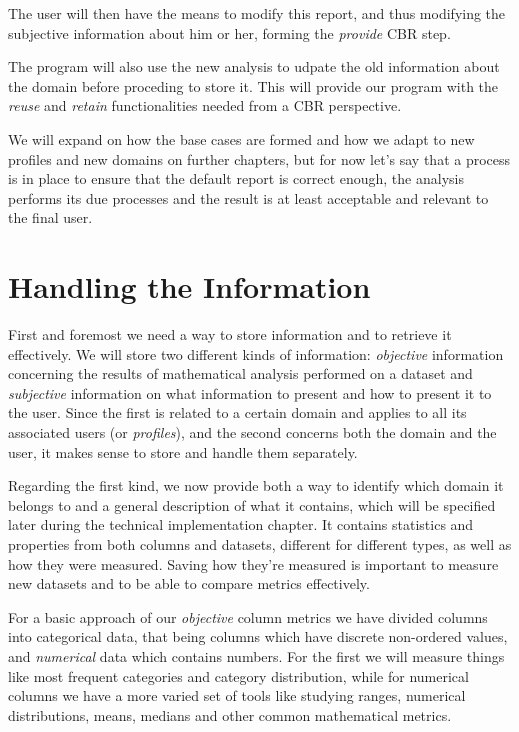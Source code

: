The user will then have the means to modify this report, and thus modifying the subjective information about him or her, forming the \textit{provide} CBR step.

The program will also use the new analysis to udpate the old information about the domain before proceding to store it.
This will provide our program with the \textit{reuse} and \textit{retain} functionalities needed from a CBR perspective.

We will expand on how the base cases are formed and how we adapt to new profiles and new domains on further chapters, but for now let's say that a process is in place to ensure that the default report is correct enough, the analysis performs its due processes and the result is at least acceptable and relevant to the final user.

\section{Handling the Information}
\label{cap2:sec:information}

First and foremost we need a way to store information and to retrieve it effectively. We will store two different kinds of information: \textit{objective} information concerning the results of mathematical analysis performed on a dataset and \textit{subjective} information on what information to present and how to present it to the user.
Since the first is related to a certain domain and applies to all its associated users (or \textit{profiles}), and the second concerns both the domain and the user, it makes sense to store and handle them separately.

Regarding the first kind, we now provide both a way to identify which domain it belongs to and a general description of what it contains, which will be specified later during the technical implementation chapter.
It contains statistics and properties from both columns and datasets, different for different types, as well as how they were measured. Saving how they're measured is important to measure new datasets and to be able to compare metrics effectively.

For a basic approach of our \textit{objective} column metrics we have divided columns into categorical data, that being columns which have discrete non-ordered values, and \textit{numerical} data which contains numbers.
For the first we will measure things like most frequent categories and category distribution, while for numerical columns we have a more varied set of tools like studying ranges, numerical distributions, means, medians and other common mathematical metrics.

